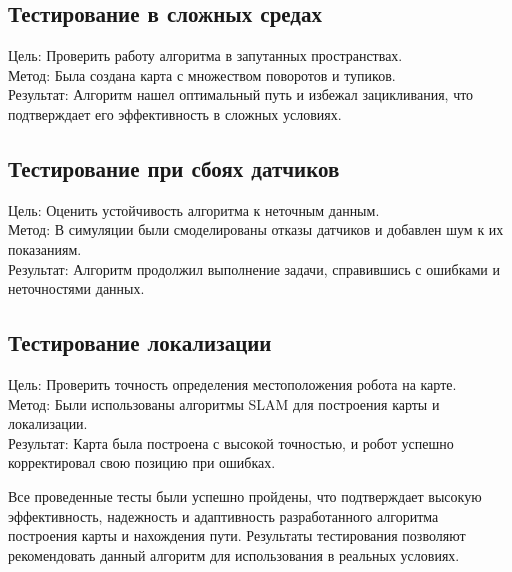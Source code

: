 \subsection{Тестирование в сложных средах}
Цель: Проверить работу алгоритма в запутанных пространствах. \\
Метод: Была создана карта с множеством поворотов и тупиков. \\
Результат: Алгоритм нашел оптимальный путь и избежал зацикливания, что подтверждает его эффективность в сложных условиях.

\subsection{Тестирование при сбоях датчиков}
Цель: Оценить устойчивость алгоритма к неточным данным. \\
Метод: В симуляции были смоделированы отказы датчиков и добавлен шум к их показаниям. \\
Результат: Алгоритм продолжил выполнение задачи, справившись с ошибками и неточностями данных.

\subsection{Тестирование локализации}
{Цель}: Проверить точность определения местоположения робота на карте. \\
{Метод}: Были использованы алгоритмы SLAM для построения карты и локализации. \\
{Результат}: Карта была построена с высокой точностью, и робот успешно корректировал свою позицию при ошибках.

Все проведенные тесты были успешно пройдены, что подтверждает высокую эффективность, надежность и адаптивность разработанного алгоритма построения карты и нахождения пути. Результаты тестирования позволяют рекомендовать данный алгоритм для использования в реальных условиях.
